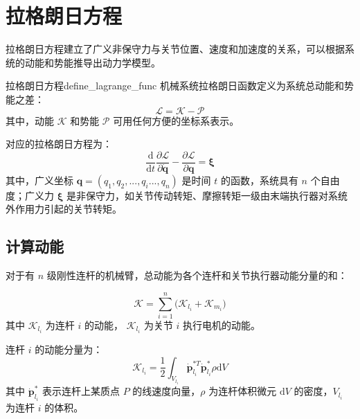 \documentclass[cn,11pt,chinese,blue,bibstyle=ieeetr]{elegantbook}
\begin{document}
\section{拉格朗日方程}

拉格朗日方程建立了广义非保守力与关节位置、速度和加速度的关系，可以根据系统的动能和势能推导出动力学模型。

\begin{definition}{拉格朗日方程}{define_lagrange_func}
机械系统拉格朗日函数定义为系统总动能和势能之差：
\begin{equation}\label{robot_lagrange_func}
\mathcal{L} = \mathcal{K} - \mathcal{P}
\end{equation}
其中，动能 $\mathcal{K}$ 和势能 $\mathcal{P}$ 可用任何方便的坐标系表示。

对应的拉格朗日方程为：
\begin{equation}\label{robot_lagrange_kinematics_equation}
\frac{\mathrm{d}}{\mathrm{d}t} \frac{\partial \mathcal{L}}{\partial \dot{\bm{q}}} - \frac{\partial \mathcal{L}}{\partial \bm{q}} = \bm{\xi}
\end{equation}
其中，广义坐标 $\bm{q} = (q_1, q_2, ..., q_i ..., q_n)$ 是时间 $t$ 的函数，系统具有 $n$ 个自由度；广义力 $\bm{\xi}$ 是非保守力，如关节传动转矩、摩擦转矩一级由末端执行器对系统外作用力引起的关节转矩。
\end{definition}


\subsection{计算动能}

对于有 $n$ 级刚性连杆的机械臂，总动能为各个连杆和关节执行器动能分量的和：

\begin{equation}\label{total_kinetic_energy_of_rigid_manipulator}
	\mathcal{K} = \sum_{i = 1}^{n} \big( \mathcal{K}_{l_i} + \mathcal{K}_{m_i} \big)
\end{equation}
其中 $\mathcal{K}_{l_i}$ 为连杆 $i$ 的动能， $\mathcal{K}_{l_i}$ 为关节 $i$ 执行电机的动能。

连杆 $i$ 的动能分量为：
\begin{equation}\label{link_kinetic_energy_equation}
	\mathcal{K}_{l_i} = \frac{1}{2} \int_{V_{l_i}} { {{\bm{\dot p}}_{l_i}^{*T}} {{\bm{\dot p}}_{l_i}^*} \rho \mathrm{d}V }
\end{equation}
其中 $\dot{\bm{p}}_{l_i}^*$ 表示连杆上某质点 $P$ 的线速度向量，$\rho$ 为连杆体积微元 $\mathrm{d}V$ 的密度，$V_{l_i}$ 为连杆 $i$ 的体积。
\end{document}
